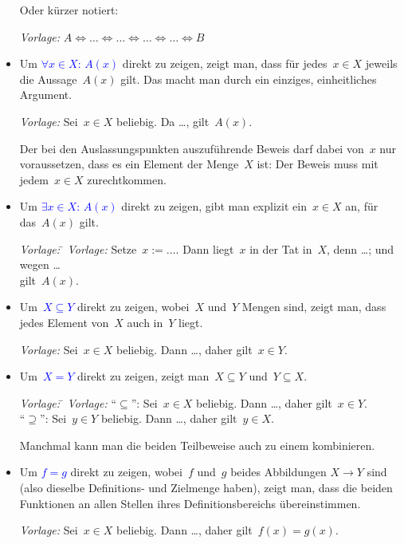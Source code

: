 \documentclass[12pt,a4paper,ngerman]{scrartcl}
\theoremstyle{definition}
\theoremstyle{plain}
\theoremstyle{remark}
\newcommand{\hil}[1]{\textcolor{blue}{#1}}
\begin{document}
\begin{itemize}
Oder kürzer notiert:

\emph{Vorlage:} $A \Leftrightarrow \ldots \Leftrightarrow \ldots
\Leftrightarrow \ldots \Leftrightarrow \ldots \Leftrightarrow B$

\item Um \hil{$\forall x\in X{:}\, A(x)$} direkt zu zeigen, zeigt man, dass für
jedes~$x \in X$ jeweils die Aussage~$A(x)$ gilt. Das macht man durch ein
einziges, einheitliches Argument.

\emph{Vorlage:} Sei~$x \in X$ beliebig. Da \ldots, gilt~$A(x)$.

Der bei den Auslassungspunkten auszuführende Beweis darf dabei von~$x$ nur
voraussetzen, dass es ein Element der Menge~$X$ ist: Der Beweis muss mit
jedem~$x \in X$ zurechtkommen.

\item Um \hil{$\exists x \in X{:}\, A(x)$} direkt zu zeigen, gibt man explizit ein~$x
\in X$ an, für das~$A(x)$ gilt.

\begin{tabbing}
  \emph{Vorlage:} \= \kill
  \emph{Vorlage:} \> Setze~$x := \ldots$. Dann liegt~$x$ in der Tat in~$X$,
denn \ldots; und wegen \ldots \\
  \> gilt~$A(x)$.
\end{tabbing}

\item Um~\hil{$X \subseteq Y$} direkt zu zeigen, wobei~$X$ und~$Y$ Mengen sind,
zeigt man, dass jedes Element von~$X$ auch in~$Y$ liegt.

\emph{Vorlage:} Sei~$x \in X$ beliebig. Dann \ldots, daher gilt~$x \in Y$.

\item
Um~\hil{$X = Y$} direkt zu zeigen, zeigt man~$X \subseteq Y$ und~$Y \subseteq
X$.

\begin{tabbing}
  \emph{Vorlage:} \= \kill
  \emph{Vorlage:} \> "`$\subseteq$"': Sei~$x \in X$ beliebig. Dann \ldots,
  daher gilt~$x \in Y$. \\
  \> "`$\supseteq$"': Sei~$y \in Y$ beliebig. Dann \ldots, daher gilt~$y \in
  X$.
\end{tabbing}

Manchmal kann man die beiden Teilbeweise auch zu einem kombinieren.

\item Um \hil{$f = g$} direkt zu zeigen, wobei~$f$ und~$g$ beides Abbildungen
$X \to Y$ sind (also dieselbe Definitions- und Zielmenge haben), zeigt
man, dass die beiden Funktionen an allen Stellen ihres Definitionsbereichs
übereinstimmen.

\emph{Vorlage:} Sei~$x \in X$ beliebig. Dann \ldots, daher gilt~$f(x) = g(x)$.
\end{itemize}
\end{document}
